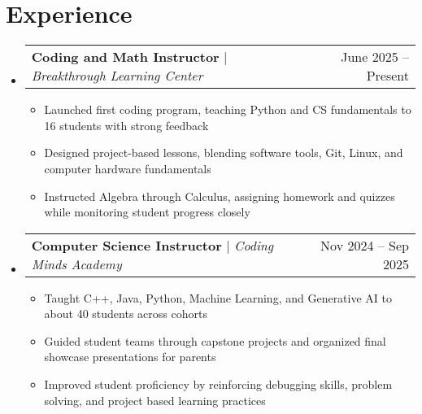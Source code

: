 \documentclass[letterpaper,11pt]{article}
\makeatletter
\newcommand{\resumeItem}[1]{
  \item\small{
    {#1 \vspace{-2pt}}
  }
}
\newcommand{\resumeSubSubheading}[2]{
    \item
    \begin{tabular*}{0.97\textwidth}{l@{\extracolsep{\fill}}r}
      \textit{\small#1} & \textit{\small #2} \\
    \end{tabular*}\vspace{-7pt}
}
\newcommand{\resumeProjectHeading}[2]{
    \item
    \begin{tabular*}{0.97\textwidth}{l@{\extracolsep{\fill}}r}
      \small#1 & #2 \\
    \end{tabular*}\vspace{-7pt}
}
\newcommand{\resumeSubHeadingListStart}{\begin{itemize}[leftmargin=0.15in, label={}]}
\newcommand{\resumeSubHeadingListEnd}{\end{itemize}}
\newcommand{\resumeItemListStart}{\begin{itemize}}
\newcommand{\resumeItemListEnd}{\end{itemize}\vspace{-5pt}}
\makeatother
\begin{document}
\section{Experience}
    \resumeSubHeadingListStart
    \resumeProjectHeading
          {\textbf{Coding and Math Instructor} $|$ \emph{Breakthrough Learning Center}}{June 2025 -- Present}
          \resumeItemListStart
            \resumeItem{Launched first coding program, teaching Python and CS fundamentals to 16 students with strong feedback}
            \resumeItem{Designed project-based lessons, blending software tools, Git, Linux, and computer hardware fundamentals}
            \resumeItem{Instructed Algebra through Calculus, assigning homework and quizzes while monitoring student progress closely}
          \resumeItemListEnd
          \resumeProjectHeading
          {\textbf{Computer Science Instructor} $|$ \emph{Coding Minds Academy}}{Nov 2024 -- Sep 2025}
          \resumeItemListStart
            \resumeItem{Taught C++, Java, Python, Machine Learning, and Generative AI to about 40 students across cohorts}
            \resumeItem{Guided student teams through capstone projects and organized final showcase presentations for parents}
            \resumeItem{Improved student proficiency by reinforcing debugging skills, problem solving, and project based learning practices}
          \resumeItemListEnd
    \resumeSubHeadingListEnd
      


\end{document}
